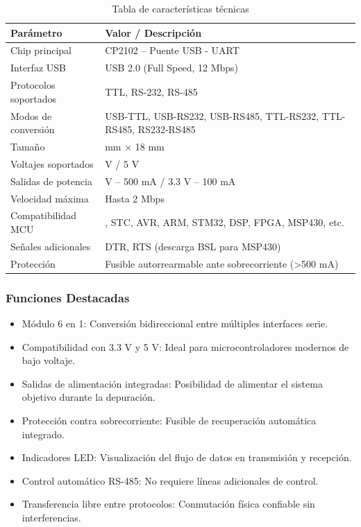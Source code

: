 \documentclass[12pt,a4paper]{article}
\begin{document}
\begin{table}[H]
    \centering
\begin{tabular}{|>{\raggedright}p{5cm}|>{\raggedright\arraybackslash}p{8cm}|}
\hline
\textbf{Parámetro} & \textbf{Valor / Descripción} \\
\hline
Chip principal & CP2102 – Puente USB - UART \\
\hline
Interfaz USB & USB 2.0 (Full Speed, 12 Mbps) \\
\hline
Protocolos soportados & TTL, RS-232, RS-485 \\
\hline
Modos de conversión & USB-TTL, USB-RS232, USB-RS485, TTL-RS232, TTL-RS485, RS232-RS485 \\
\hline
Tamaño & 32 mm × 18 mm \\
\hline
Voltajes soportados & 3.3 V / 5 V \\
\hline
Salidas de potencia & 5 V – 500 mA / 3.3 V – 100 mA \\
\hline
Velocidad máxima & Hasta 2 Mbps \\
\hline
Compatibilidad MCU & 8051, STC, AVR, ARM, STM32, DSP, FPGA, MSP430, etc. \\
\hline
Señales adicionales & DTR, RTS (descarga BSL para MSP430) \\
\hline
Protección & Fusible autorrearmable ante sobrecorriente (>500 mA) \\
\hline
\end{tabular}
\caption{Tabla de características técnicas}
\end{table}

\subsubsection{Funciones Destacadas}
\begin{itemize}
    \item Módulo 6 en 1: Conversión bidireccional entre múltiples interfaces serie.
    \item Compatibilidad con 3.3 V y 5 V: Ideal para microcontroladores modernos de bajo voltaje.
    \item Salidas de alimentación integradas: Posibilidad de alimentar el sistema objetivo durante la depuración.
    \item Protección contra sobrecorriente: Fusible de recuperación automática integrado.
    \item Indicadores LED: Visualización del flujo de datos en transmisión y recepción.
    \item Control automático RS-485: No requiere líneas adicionales de control.
    \item Transferencia libre entre protocolos: Conmutación física confiable sin interferencias.
\end{itemize}
\end{document}
